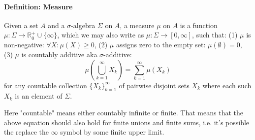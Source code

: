 









\paragraph{Definition: Measure} Given a set $A$ and a $\sigma$-algebra $\Sigma$ on $A$, a measure $\mu$ on $A$ is a function $\mu: \Sigma \rightarrow \mathbb{R}^+_0 \cup \{  \infty \}$, which we may also write as $\mu: \Sigma \rightarrow [0, \infty]$, such that: (1) $\mu$ is non-negative: $\forall X: \mu(X) \geq 0$, (2) $\mu$ assigns zero to the empty set: $\mu(\emptyset) = 0$, (3) $\mu$ is countably additive aka $\sigma$-additive:
\begin{equation}
\mu \left( \bigcup_{k=1}^{\infty} X_k \right) = \sum_{k=1}^{\infty}	\mu(X_k)
\end{equation}
for any countable collection $\{X_k\}_{k=1}^{\infty}$ of pairwise disjoint sets $X_k$ where each such $X_k$ is an element of $\Sigma$.

\medskip
Here "countable" means either countably infinite or finite. That means that the above equation should also hold for finite unions and finite sums, i.e. it's possible the replace the $\infty$ symbol by some finite upper limit.



